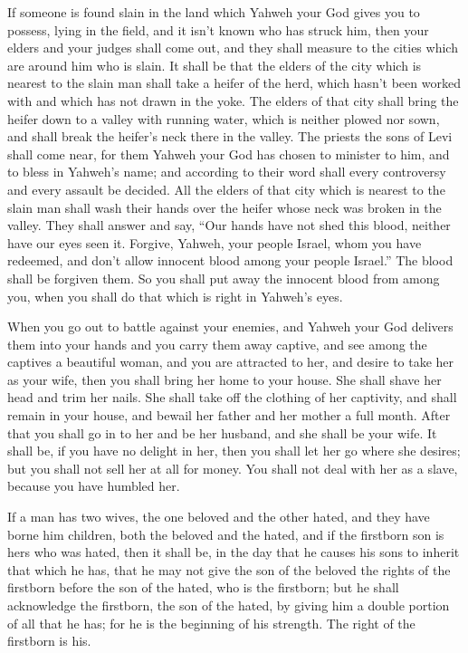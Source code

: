  If someone is found slain in the land which Yahweh your God
gives you to possess, lying in the field, and it isn't known who has
struck him,  then your elders and your judges shall come
out, and they shall measure to the cities which are around him who is
slain.  It shall be that the elders of the city which is
nearest to the slain man shall take a heifer of the herd, which hasn't
been worked with and which has not drawn in the yoke.  The
elders of that city shall bring the heifer down to a valley with running
water, which is neither plowed nor sown, and shall break the heifer's
neck there in the valley.  The priests the sons of Levi
shall come near, for them Yahweh your God has chosen to minister to him,
and to bless in Yahweh's name; and according to their word shall every
controversy and every assault be decided.  All the elders of
that city which is nearest to the slain man shall wash their hands over
the heifer whose neck was broken in the valley.  They shall
answer and say, ``Our hands have not shed this blood, neither have our
eyes seen it.  Forgive, Yahweh, your people Israel, whom you
have redeemed, and don't allow innocent blood among your people
Israel.'' The blood shall be forgiven them.  So you shall
put away the innocent blood from among you, when you shall do that which
is right in Yahweh's eyes.

 When you go out to battle against your enemies, and Yahweh
your God delivers them into your hands and you carry them away captive,
 and see among the captives a beautiful woman, and you are
attracted to her, and desire to take her as your wife, 
then you shall bring her home to your house. She shall shave her head
and trim her nails.  She shall take off the clothing of her
captivity, and shall remain in your house, and bewail her father and her
mother a full month. After that you shall go in to her and be her
husband, and she shall be your wife.  It shall be, if you
have no delight in her, then you shall let her go where she desires; but
you shall not sell her at all for money. You shall not deal with her as
a slave, because you have humbled her.

 If a man has two wives, the one beloved and the other
hated, and they have borne him children, both the beloved and the hated,
and if the firstborn son is hers who was hated,  then it
shall be, in the day that he causes his sons to inherit that which he
has, that he may not give the son of the beloved the rights of the
firstborn before the son of the hated, who is the firstborn;
 but he shall acknowledge the firstborn, the son of the
hated, by giving him a double portion of all that he has; for he is the
beginning of his strength. The right of the firstborn is his.

